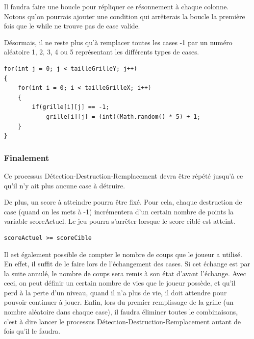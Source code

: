 	Il faudra faire une boucle pour répliquer ce résonnement à chaque colonne. Notons qu'on pourrais ajouter une condition qui arrêterais la boucle la première fois que le while ne trouve pas de case valide.
	
	Désormais, il ne reste plus qu'à remplacer toutes les cases -1 par un numéro aléatoire 1, 2, 3, 4 ou 5 représentant les différents types de cases.

\begin{lstlisting}
for(int j = 0; j < tailleGrilleY; j++)
{
	for(int i = 0; i < tailleGrilleX; i++)
	{
		if(grille[i][j] == -1;
			grille[i][j] = (int)(Math.random() * 5) + 1;
	}
}
\end{lstlisting}

\subsubsection{Finalement}

Ce processus Détection-Destruction-Remplacement devra être répété jusqu'à ce qu'il n'y ait plus aucune case à détruire.

De plus, un score à atteindre pourra être fixé. Pour cela, chaque destruction de case (quand on les mets à -1) incrémentera d'un certain nombre de points la variable scoreActuel. Le jeu pourra s'arrêter lorsque le score ciblé est atteint.
\begin{lstlisting}
scoreActuel >= scoreCible
\end{lstlisting}

Il est également possible de compter le nombre de coups que le joueur a utilisé. En effet, il suffit de le faire lors de l'échangement des cases. Si cet échange est par la suite annulé, le nombre de coups sera remis à son état d'avant l'échange.
Avec ceci, on peut définir un certain nombre de vies que le joueur possède, et qu'il perd à la perte d'un niveau, quand il n'a plus de vie, il doit attendre pour pouvoir continuer à jouer.
Enfin, lors du premier remplissage de la grille (un nombre aléatoire dans chaque case), il faudra éliminer toutes le combinaisons, c'est à dire lancer le processus Détection-Destruction-Remplacement autant de fois qu'il le faudra.

